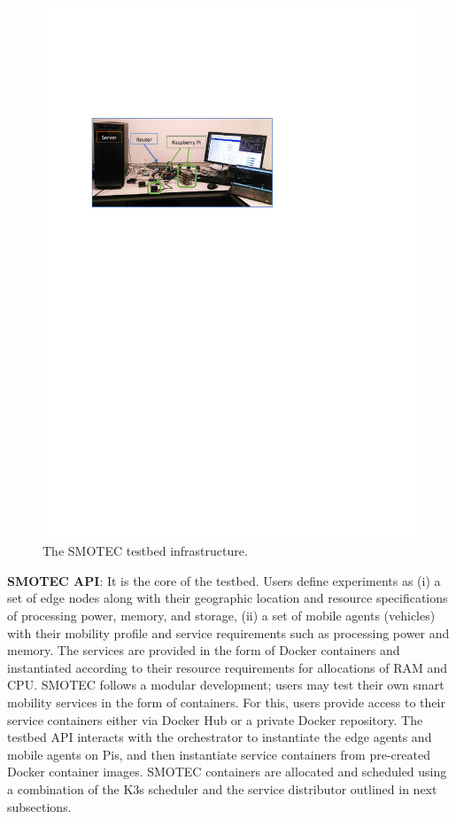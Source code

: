 \documentclass[conference]{IEEEtran}
\begin{document}
\begin{figure}[!htb]
\centering
\includegraphics[clip, trim=2.6cm 19cm 8cm 6cm, width=1.0\columnwidth]{figures/testbed1.pdf}
\caption{The SMOTEC testbed infrastructure.}
\label{fig:testbed}
\end{figure}

\noindent \textbf{SMOTEC API}: It is the core of the testbed. Users define experiments as (i) a set of edge nodes along with their geographic location and resource specifications of processing power, memory, and storage, (ii) a set of mobile agents (vehicles) with their mobility profile and service requirements such as processing power and memory. The services are provided in the form of Docker containers and instantiated according to their resource requirements for allocations of RAM and CPU. 
SMOTEC follows a modular development; users may test their own smart mobility services in the form of containers. For this, users provide access to their service containers either via Docker Hub or a private Docker repository. 
The testbed API interacts with the orchestrator to instantiate the edge agents and mobile agents on Pis, and then instantiate service containers from pre-created Docker container images. SMOTEC containers are allocated and scheduled using a combination of the K3s scheduler and the service distributor outlined in next subsections.
\end{document}
